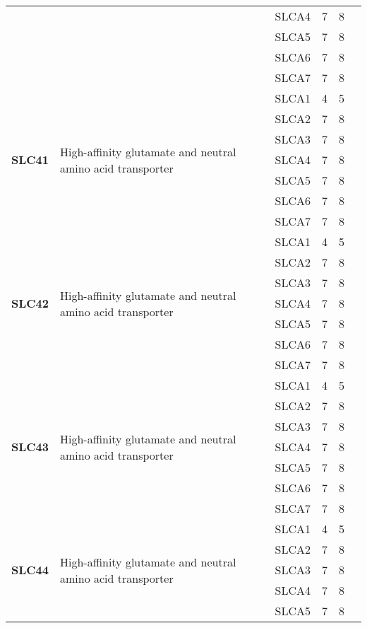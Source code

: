 \documentclass[12pt]{report}
\begin{document}
\begin{center}
\begin{longtable}{|p{1.5cm}|p{3.2cm}|p{1.9cm}|p{1.65cm}|p{3cm}|p{3cm}|}
\cline{3-6}
&&SLCA4&7 & 8&\\ 
\cline{3-6}
&&SLCA5&7 & 8&\\ 
\cline{3-6}
&&SLCA6&7 & 8&\\ 
\cline{3-6}
&&SLCA7&7 & 8&\\ 
\hline
\multirow{7}{1.5cm}{\textbf{SLC41}} & \multirow{7}{4cm}{High-affinity glutamate and neutral amino acid transporter} & SLCA1 & 4 & 5\\ 
\cline{3-6}
&&SLCA2&7 & 8&\\ 
\cline{3-6}
&&SLCA3&7 & 8&\\ 
\cline{3-6}
&&SLCA4&7 & 8&\\ 
\cline{3-6}
&&SLCA5&7 & 8&\\ 
\cline{3-6}
&&SLCA6&7 & 8&\\ 
\cline{3-6}
&&SLCA7&7 & 8&\\ 
\hline
\multirow{7}{1.5cm}{\textbf{SLC42}} & \multirow{7}{4cm}{High-affinity glutamate and neutral amino acid transporter} & SLCA1 & 4 & 5\\ 
\cline{3-6}
&&SLCA2&7 & 8&\\ 
\cline{3-6}
&&SLCA3&7 & 8&\\ 
\cline{3-6}
&&SLCA4&7 & 8&\\ 
\cline{3-6}
&&SLCA5&7 & 8&\\ 
\cline{3-6}
&&SLCA6&7 & 8&\\ 
\cline{3-6}
&&SLCA7&7 & 8&\\ 
\hline
\multirow{7}{1.5cm}{\textbf{SLC43}} & \multirow{7}{4cm}{High-affinity glutamate and neutral amino acid transporter} & SLCA1 & 4 & 5\\ 
\cline{3-6}
&&SLCA2&7 & 8&\\ 
\cline{3-6}
&&SLCA3&7 & 8&\\ 
\cline{3-6}
&&SLCA4&7 & 8&\\ 
\cline{3-6}
&&SLCA5&7 & 8&\\ 
\cline{3-6}
&&SLCA6&7 & 8&\\ 
\cline{3-6}
&&SLCA7&7 & 8&\\ 
\hline
\multirow{7}{1.5cm}{\textbf{SLC44}} & \multirow{7}{4cm}{High-affinity glutamate and neutral amino acid transporter} & SLCA1 & 4 & 5\\ 
\cline{3-6}
&&SLCA2&7 & 8&\\ 
\cline{3-6}
&&SLCA3&7 & 8&\\ 
\cline{3-6}
&&SLCA4&7 & 8&\\ 
\cline{3-6}
&&SLCA5&7 & 8&\\ 

\end{longtable}
\end{center}
\end{document}
